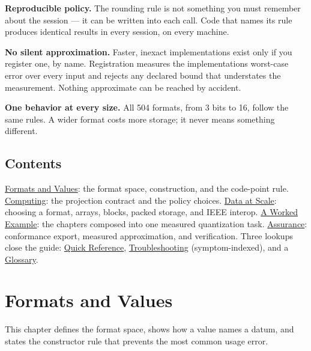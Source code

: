 \textbf{Reproducible policy.} The rounding rule is not something you must remember about the session — it can be written into each call. Code that names its rule produces identical results in every session, on every machine.



\textbf{No silent approximation.} Faster, inexact implementations exist only if you register one, by name. Registration measures the implementation{\textquotesingle}s worst-case error over every input and rejects any declared bound that understates the measurement. Nothing approximate can be reached by accident.



\textbf{One behavior at every size.} All 504 formats, from 3 bits to 16, follow the same rules. A wider format costs more storage; it never means something different.



\section{Contents}



\label{17095889498970318110}{}


\href{values.md}{Formats and Values}: the format space, construction, and the code-point rule. \href{computing.md}{Computing}: the projection contract and the policy choices. \href{data.md}{Data at Scale}: choosing a format, arrays, blocks, packed storage, and IEEE interop. \href{worked\_\allowbreak{}example.md}{A Worked Example}: the chapters composed into one measured quantization task. \href{assurance.md}{Assurance}: conformance export, measured approximation, and verification. Three lookups close the guide: \href{reference.md}{Quick Reference}, \href{troubleshooting.md}{Troubleshooting} (symptom-indexed), and a \href{glossary.md}{Glossary}.





\chapter{Formats and Values}



\label{7221816083003893795}{}


This chapter defines the format space, shows how a value names a datum, and states the constructor rule that prevents the most common usage error.




